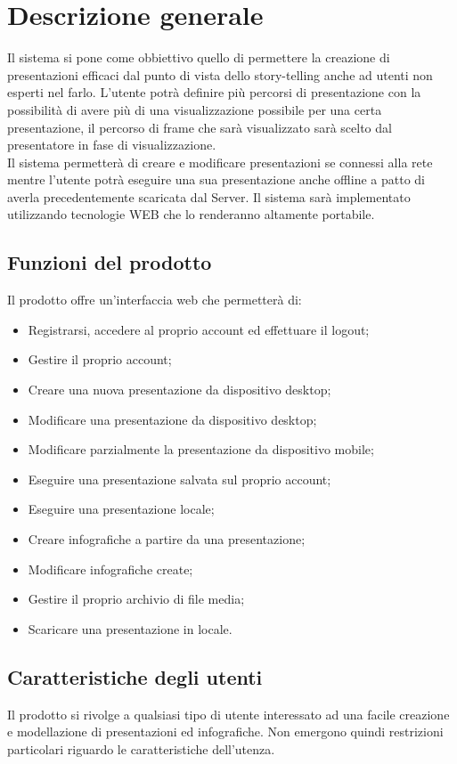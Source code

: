 \section{Descrizione generale}{
Il sistema si pone come obbiettivo quello di permettere la creazione di presentazioni efficaci dal punto di vista dello story-telling anche ad utenti non esperti nel farlo.
L'utente potrà definire più percorsi di presentazione con la possibilità di avere più di una visualizzazione possibile per una certa presentazione, il percorso di frame che sarà visualizzato sarà scelto dal presentatore in fase di visualizzazione.\\
Il sistema permetterà di creare e modificare presentazioni se connessi alla rete mentre l'utente potrà eseguire una sua presentazione anche offline a patto di averla precedentemente scaricata dal Server.
Il sistema sarà implementato utilizzando tecnologie WEB che lo renderanno altamente portabile.

\subsection{Funzioni del prodotto}{
	Il prodotto offre un'interfaccia web che permetterà di:
	\begin{itemize}
		\item Registrarsi, accedere al proprio account ed effettuare il logout;
		\item Gestire il proprio account;
		\item Creare una nuova presentazione da dispositivo desktop;
		\item Modificare una presentazione da dispositivo desktop;
		\item Modificare parzialmente la presentazione da dispositivo mobile;
		\item Eseguire una presentazione salvata sul proprio account;
		\item Eseguire una presentazione locale;
		\item Creare infografiche a partire da una presentazione;
		\item Modificare infografiche create;
		\item Gestire il proprio archivio di file media;
		\item Scaricare una presentazione in locale.
	\end{itemize}
}
\subsection{Caratteristiche degli utenti}{
	Il prodotto si rivolge a qualsiasi tipo di utente interessato ad una facile creazione e modellazione di presentazioni ed infografiche. Non emergono quindi restrizioni particolari riguardo le caratteristiche dell'utenza.
}
}
